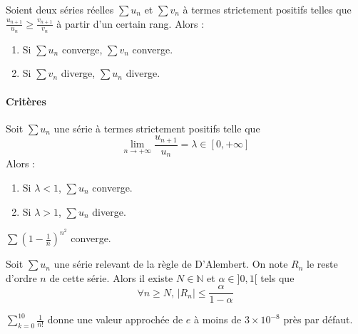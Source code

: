 
  \begin{proposition}
    Soient deux séries réelles $\sum u_n$ et $\sum v_n$ à termes strictement positifs telles que $\frac{u_{n+1}}{u_n} \geq \frac{v_{n+1}}{v_n}$ à partir d'un certain rang. Alors :
    \begin{enumerate}[label=(\roman*)]
      \item Si $\sum u_n$ converge, $\sum v_n$ converge.
      \item Si $\sum v_n$ diverge, $\sum u_n$ diverge.
    \end{enumerate}
  \end{proposition}

  \paragraph{Critères}

  \begin{proposition}
    Soit $\sum u_n$ une série à termes strictement positifs telle que
    \[ \lim_{n \rightarrow +\infty} \frac{u_{n+1}}{u_n} = \lambda \in [0, +\infty] \]
    Alors :
    \begin{enumerate}[label=(\roman*)]
      \item Si $\lambda < 1$, $\sum u_n$ converge.
      \item Si $\lambda > 1$, $\sum u_n$ diverge.
    \end{enumerate}
  \end{proposition}


  \begin{example}
    $\sum \left( 1 - \frac{1}{n} \right)^{n^2}$ converge.
  \end{example}


  \begin{proposition}
    Soit $\sum u_n$ une série relevant de la règle de D'Alembert. On note $R_n$ le reste d'ordre $n$ de cette série. Alors il existe $N \in \mathbb{N}$ et $\alpha \in ]0,1[$ tels que
    \[ \forall n \geq N, \, |R_n| \leq \frac{\alpha}{1-\alpha} \]
  \end{proposition}

  \begin{example}
    $\sum_{k=0}^{10} \frac{1}{n!}$ donne une valeur approchée de $e$ à moins de $3 \times 10^{-8}$ près par défaut.
  \end{example}

